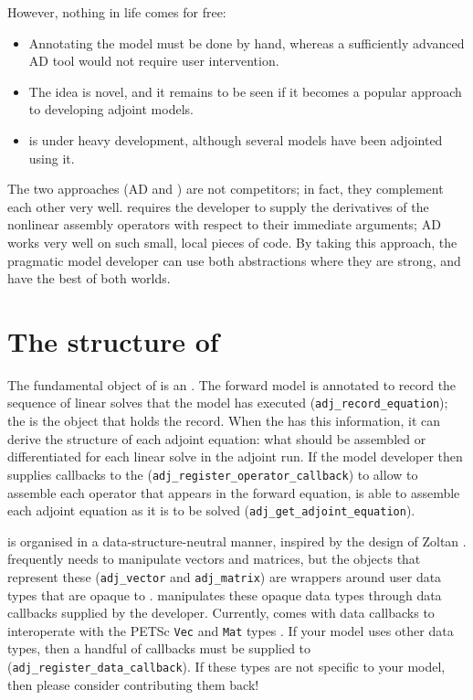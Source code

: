 However, nothing in life comes for free:
\begin{itemize}
\item Annotating the model must be done by hand, whereas a sufficiently advanced
AD tool would not require user intervention.
\item The idea is novel, and it remains to be seen if it becomes a popular approach
to developing adjoint models.
\item \libadjoint is under heavy development, although several models have been adjointed
using it.
\end{itemize}

The two approaches (AD and \libadjoint) are not competitors; in fact, they complement each
other very well. \libadjoint requires
the developer to supply the derivatives of the nonlinear assembly operators with respect to
their immediate arguments; AD works very well on such small, local pieces of code. By taking
this approach, the pragmatic model developer can use both abstractions where they are strong,
and have the best of both worlds.

\section{The structure of \libadjoint}
The fundamental object of \libadjoint is an \adjointer. The forward model is annotated
to record the sequence of linear solves that the model has executed (\texttt{adj_record_equation}); the \adjointer is
the object that holds the record. When the \adjointer has this information, it can derive
the structure of each adjoint equation: what should be assembled or differentiated for each linear
solve in the adjoint run. If the model developer then
supplies callbacks to the \adjointer (\texttt{adj_register_operator_callback}) to allow \libadjoint to assemble each
operator that appears in the forward equation, \libadjoint is
able to assemble each adjoint equation as it is to be solved (\texttt{adj_get_adjoint_equation}).

\libadjoint is organised in a data-structure-neutral manner, inspired by the design
of Zoltan \citep{devine2002}. \libadjoint frequently needs to manipulate vectors
and matrices, but the objects that represent these (\texttt{adj_vector} and \texttt{adj_matrix})
are wrappers around user data types that are opaque to \libadjoint. \libadjoint manipulates
these opaque data types through data callbacks supplied by the developer. Currently, \libadjoint
comes with data callbacks to interoperate with the PETSc \texttt{Vec} and \texttt{Mat} types \citep{balay2010}.
If your model uses other data types, then a handful of callbacks must be supplied to \libadjoint (\texttt{adj_register_data_callback}).
If these types are not specific to your model, then please consider contributing them back!

